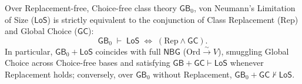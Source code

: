 \begin{proposition}\label{prop:los-smuggles-gc}%
%
Over Replacement-free, Choice-free class theory $\mathsf{GB}_0$, von Neumann's Limitation of Size ($\mathsf{LoS}$) is strictly equivalent to the conjunction of Class Replacement ($\mathrm{Rep}$) and Global Choice ($\mathsf{GC}$):
\[
  \mathsf{GB}_0 \;\vdash\; \mathsf{LoS} \;\Longleftrightarrow\; (\mathrm{Rep} \wedge \mathsf{GC}).
\]
In particular, $\mathsf{GB}_0 + \mathsf{LoS}$ coincides with full $\mathsf{NBG}$ ($\mathrm{Ord} \xrightarrow{\sim} V$), smuggling Global Choice across Choice-free bases and satisfying $\mathsf{GB} + \mathsf{GC} \vdash \mathsf{LoS}$ whenever Replacement holds; conversely, over $\mathsf{GB}_0$ without Replacement, $\mathsf{GB}_0 + \mathsf{GC} \not\vdash \mathsf{LoS}$.
\end{proposition}

